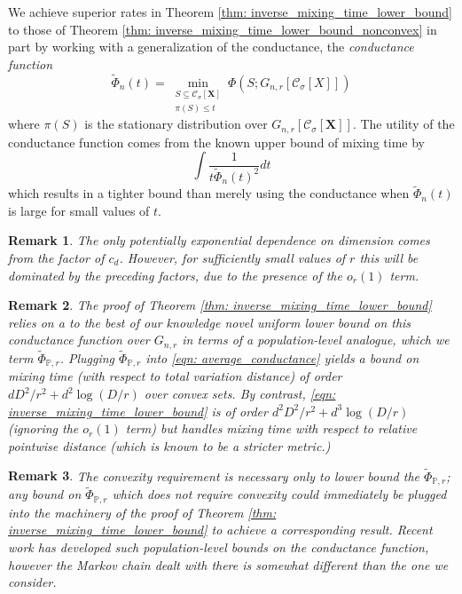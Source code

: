 \documentclass{article}
\newcommand{\1}{\mathbf{1}}
\newcommand{\Xbf}{\mathbf{X}}
\newcommand{\Pbb}{\mathbb{P}}
\newcommand{\Cset}{\mathcal{C}}
\newcommand{\Csig}{\Cset_{\sigma}}
\theoremstyle{aldenthm}
\theoremstyle{aldenrmrk}
\newtheorem{remark}{Remark}
\begin{document}
We achieve superior rates in Theorem \ref{thm: inverse_mixing_time_lower_bound} to those of Theorem \ref{thm: inverse_mixing_time_lower_bound_nonconvex} in part by working with a generalization of the conductance, the \emph{conductance function}
\begin{equation*}
\widetilde{\Phi}_n(t) = \min_{\substack{S \subseteq \Csig[\Xbf] \\ \pi(S) \leq t}} \Phi(S; G_{n,r}[\Csig[X]])
\end{equation*}
where $\pi(S)$ is the stationary distribution over $G_{n,r}[\Csig[\Xbf]]$. 
The utility of the conductance function comes from the known upper bound of mixing time by 
\begin{equation}
\label{eqn: average_conductance}
\int \frac{1}{t \widetilde{\Phi}_n(t)^2} dt
\end{equation}
 which results in a tighter bound than merely using the conductance when $\widetilde{\Phi}_n(t)$ is large for small values of $t$.
 
\begin{remark}
	The only potentially exponential dependence on dimension comes from the factor of $c_d$. However, for sufficiently small values of $r$ this will be dominated by the preceding factors, due to the presence of the $o_r(1)$ term.
\end{remark}
 
\begin{remark}
 The proof of Theorem \ref{thm: inverse_mixing_time_lower_bound} relies on a to the best of our knowledge novel uniform lower bound on this conductance function over $G_{n,r}$ in terms of a population-level analogue, which we term $\widetilde{\Phi}_{\Pbb,r}$. Plugging $\widetilde{\Phi}_{\Pbb,r}$ into \eqref{eqn: average_conductance} yields a bound on mixing time (with respect to total variation distance) of order $d D^2/r^2 + d^2\log(D/r)$ over convex sets. By contrast, \eqref{eqn: inverse_mixing_time_lower_bound} is of order $d^2 D^2/r^2 + d^3\log(D/r)$ (ignoring the $o_r(1)$ term) but handles mixing time with respect to relative pointwise distance (which is known to be a stricter metric.)
\end{remark}

\begin{remark}
	The convexity requirement is necessary only to lower bound the $\widetilde{\Phi}_{\Pbb,r}$; any bound on $\widetilde{\Phi}_{\Pbb,r}$ which does not require convexity could immediately be plugged into the machinery of the proof of Theorem \ref{thm: inverse_mixing_time_lower_bound} to achieve a corresponding result. Recent work \cite{abbasi17} has developed such population-level bounds on the conductance function, however the Markov chain dealt with there is somewhat different than the one we consider. 
\end{remark}
\end{document}
